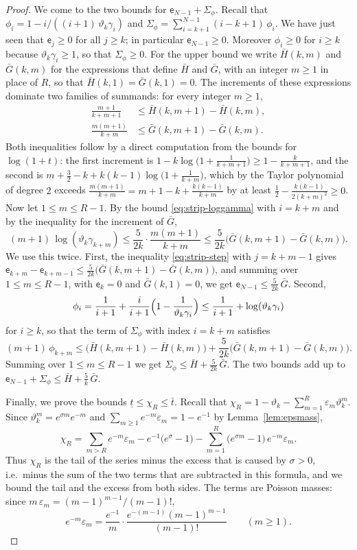 \documentclass{amsart}
\theoremstyle{definition}
\theoremstyle{remark}
\numberwithin{equation}{section}
\begin{document}
\begin{proof}
We come to the two bounds for $\mathsf e_{N-1}+\Sigma_\phi$. Recall that $\phi_i=1-i/((i+1)\,\vartheta_k\gamma_i)$ and $\Sigma_\phi=\sum_{i=k+1}^{N-1}(i-k+1)\,\phi_i$. We have just seen that $\mathsf e_j\ge 0$ for all $j\ge k$; in particular $\mathsf e_{N-1}\ge 0$. Moreover $\phi_i\ge 0$ for $i\ge k$ because $\vartheta_k\gamma_i\ge 1$, so that $\Sigma_\phi\ge 0$. For the upper bound we write $\bar H(k,m)$ and $\bar G(k,m)$ for the expressions that define $\bar H$ and $\bar G$, with an integer $m\ge 1$ in place of $R$, so that $\bar H(k,1)=\bar G(k,1)=0$. The increments of these expressions dominate two families of summands: for every integer $m\ge 1$,
\[
\begin{aligned}
\frac{m+1}{k+m+1}&\le\bar H(k,m+1)-\bar H(k,m),\\
\frac{m(m+1)}{k+m}&\le\bar G(k,m+1)-\bar G(k,m).
\end{aligned}
\]
Both inequalities follow by a direct computation from the bounds for $\log(1+t)$: the first increment is $1-k\log\bigl(1+\frac{1}{k+m+1}\bigr)\ge 1-\frac{k}{k+m+1}$, and the second is $m+\frac32-k+k(k-1)\log\bigl(1+\frac{1}{k+m}\bigr)$, which by the Taylor polynomial of degree $2$ exceeds $\frac{m(m+1)}{k+m}=m+1-k+\frac{k(k-1)}{k+m}$ by at least $\frac12-\frac{k(k-1)}{2(k+m)^2}\ge 0$. Now let $1\le m\le R-1$. By the bound \eqref{eq:strip-loggamma} with $i=k+m$ and by the inequality for the increment of $\bar G$,
\[
(m+1)\,\log(\vartheta_k\gamma_{k+m})\le\frac{5}{2k}\cdot\frac{m(m+1)}{k+m}\le\frac{5}{2k}\bigl(\bar G(k,m+1)-\bar G(k,m)\bigr).
\]
We use this twice. First, the inequality \eqref{eq:strip-step} with $j=k+m-1$ gives $\mathsf e_{k+m}-\mathsf e_{k+m-1}\le\frac{5}{2k}\bigl(\bar G(k,m+1)-\bar G(k,m)\bigr)$, and summing over $1\le m\le R-1$, with $\mathsf e_k=0$ and $\bar G(k,1)=0$, we get $\mathsf e_{N-1}\le\frac{5}{2k}\,\bar G$. Second,
\[
\phi_i=\frac{1}{i+1}+\frac{i}{i+1}\Bigl(1-\frac{1}{\vartheta_k\gamma_i}\Bigr)\le\frac{1}{i+1}+\log(\vartheta_k\gamma_i)
\]
for $i\ge k$, so that the term of $\Sigma_\phi$ with index $i=k+m$ satisfies
\[
(m+1)\,\phi_{k+m}\le\bigl(\bar H(k,m+1)-\bar H(k,m)\bigr)+\frac{5}{2k}\bigl(\bar G(k,m+1)-\bar G(k,m)\bigr).
\]
Summing over $1\le m\le R-1$ we get $\Sigma_\phi\le\bar H+\frac{5}{2k}\,\bar G$. The two bounds add up to $\mathsf e_{N-1}+\Sigma_\phi\le\bar H+\frac5k\,\bar G$.

Finally, we prove the bounds $\underline t\le\chi_R\le\bar t$. Recall that $\chi_R=1-\vartheta_k-\sum_{m=1}^{R}\varepsilon_m\vartheta_k^m$. Since $\vartheta_k^m=e^{\sigma m}e^{-m}$ and $\sum_{m\ge 1}e^{-m}\varepsilon_m=1-e^{-1}$ by Lemma~\ref{lem:epsmass},
\[
\chi_R=\sum_{m>R}e^{-m}\varepsilon_m-e^{-1}\bigl(e^{\sigma}-1\bigr)-\sum_{m=1}^{R}\bigl(e^{\sigma m}-1\bigr)\,e^{-m}\varepsilon_m.
\]
Thus $\chi_R$ is the tail of the series minus the excess that is caused by $\sigma>0$, i.e.\ minus the sum of the two terms that are subtracted in this formula, and we bound the tail and the excess from both sides. The terms are Poisson masses: since $m\,\varepsilon_m=(m-1)^{m-1}/(m-1)!$,
\[
e^{-m}\varepsilon_m=\frac{e^{-1}}{m}\cdot\frac{e^{-(m-1)}(m-1)^{m-1}}{(m-1)!}\qquad(m\ge 1).
\]


\end{proof}
\end{document}

